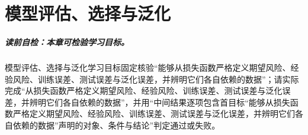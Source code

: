 
\chapter{模型评估、选择与泛化}\label{chap:V1-C10}



\label{struct:V1-C10-CH01}
\paragraph{读前自检：本章可检验学习目标。}模型评估、选择与泛化学习目标固定核验“能够从损失函数严格定义期望风险、经验风险、训练误差、测试误差与泛化误差，并辨明它们各自依赖的数据”；请实际完成“从损失函数严格定义期望风险、经验风险、训练误差、测试误差与泛化误差，并辨明它们各自依赖的数据”，并用“中间结果逐项包含首目标“能够从损失函数严格定义期望风险、经验风险、训练误差、测试误差与泛化误差，并辨明它们各自依赖的数据”声明的对象、条件与结论”判定通过或失败。\par

